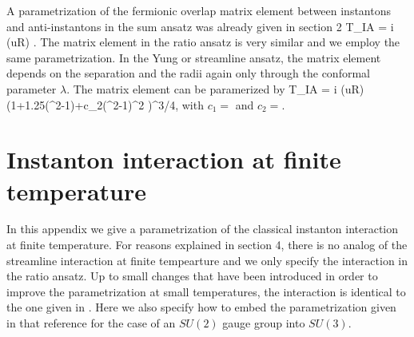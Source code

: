    A parametrization of the fermionic overlap matrix element
between instantons and anti-instantons in the sum ansatz was
already given in section 2
\be
\label{sum_overl2}
 T_{IA} = i (u\cdot R)  
     .
\ee
The matrix element in the ratio ansatz is very similar and we
employ the same parametrization. In the Yung or streamline ansatz,
the matrix element depends on the separation and the radii again only
through the conformal parameter $\lambda$. The matrix element can
be paramerized by \cite{SV_92}
\be
\label{stream_over}
 T_{IA} = i (u\cdot R)  
         {(1+1.25(\lambda^2-1)+c_2(\lambda^2-1)^2 )^{3/4}},
\ee
with $c_1=$ and $c_2=$.

\section{Instanton interaction at finite temperature}

    In this appendix we give a parametrization of the classical
instanton interaction at finite temperature. For reasons explained
in section 4, there is no analog of the streamline interaction
at finite tempearture and we only specify the interaction in the
ratio ansatz. Up to small changes
that have been introduced in order to improve the parametrization
at small temperatures, the interaction is identical to the one
given in \cite{SV_91}. Here we also specify how to embed the
parametrization given in that reference for the case of an $SU(2)$
gauge group into $SU(3)$.

